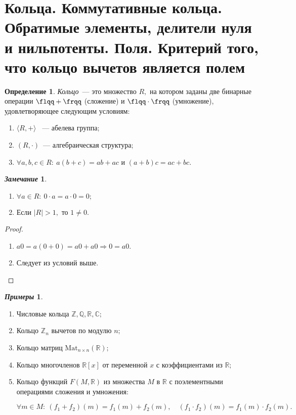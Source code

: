 \documentclass[a4paper, 14pt]{extarticle}
\newcommand{\n}{\par}
\newcommand{\integers}{\mathbb{Z}}
\newcommand{\rationals}{\mathbb{Q}}
\newcommand{\real}{\mathbb{R}}
\newcommand{\complex}{\mathbb{C}}
\newcommand{\suchthat}{{:}{-} \ }
\theoremstyle{definition}
\newtheorem*{exmpls}{\textit{Примеры}}
\newtheorem*{remark}{\textit{Замечание}}
\newtheorem{definition}{Определение}
\theoremstyle{plain}
\numberwithin{theorem}{section}
\numberwithin{definition}{section}
\numberwithin{statement}{section}
\numberwithin{lemma}{section}
\numberwithin{consequence}{section}
\begin{document}
	\section{Кольца. Коммутативные кольца. Обратимые элементы, делители нуля и нильпотенты. Поля. Критерий того, что кольцо вычетов является полем}
	\setcounter{definition}{0}
	\begin{definition}
		\textit{Кольцо}~--- это множество $R,$ на котором заданы две бинарные операции ${\flqq+\frqq}$ (сложение) и ${\flqq \cdot \frqq}$ (умножение), удовлетворяющее следующим условиям:
		\begin{enumerate}
			\setlength\itemsep{0.1em}
			\item $\langle R, + \rangle$ ~--- абелева группа;
			\item $(R, \cdot)$~--- алгебраическая структура;
			\item $\forall a, b, c \in R{:} \ a(b + c) = ab + ac$ и $(a + b)c = ac + bc.$
		\end{enumerate} 
	\end{definition}
	\begin{remark}
		\
		\begin{enumerate}
			\setlength\itemsep{0.1em}
			\item $\forall a \in R{:} \ 0 \cdot a = a \cdot 0 = 0;$
			\item Если $|R| > 1,$ то $1 \neq 0.$ 
		\end{enumerate}
	\end{remark}
	\begin{proof}
		\
		\begin{enumerate}
			\setlength\itemsep{0.1em}
			\item $a0 = a(0 + 0) = a0 + a0 \Longrightarrow 0 = a0.$
			\item Следует из условий выше. \qedhere
		\end{enumerate}
	\end{proof}
	\begin{exmpls}
		\
		\begin{enumerate}
			\setlength\itemsep{0.1em}
			\item Числовые кольца $\integers, \rationals, \real, \complex;$
			\item Кольцо $\integers_n$ вычетов по модулю $n;$
			\item Кольцо матриц $\mathrm{Mat}_{n \times n}(\real);$
			\item Кольцо многочленов $\real[x]$ от переменной $x$ с коэффициентами из $\real;$
			\item Кольцо функций $F(M, \real)$ из множества $M$ в $\real$ с поэлементными
			операциями сложения и умножения: \n
			$\forall m \in M{:} \ (f_1 + f_2)(m) = f_1(m) + f_2(m), \quad (f_1 \cdot f_2)(m) = f_1(m) \cdot f_2(m).$
		\end{enumerate}
	\end{exmpls}
	\newpage
	
\end{document}
